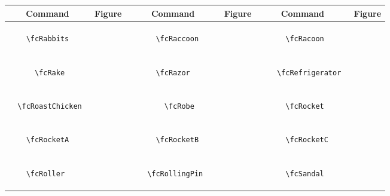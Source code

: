 \documentclass[x11names]{article}
\begin{document}
\begin{table}[H]\centering\begin{tabular}{|c|c|c|c|c|c|}\hline{\bf Command} & {\bf Figure} & {\bf Command} & {\bf Figure} & {\bf Command} & {\bf Figure}\\	\hline	&\multirow{5}{*}{	\fcRabbits	[scale=0.16]} & &\multirow{5}{*}{	\fcRaccoon	[scale=0.16]} & &\multirow{5}{*}{	\fcRacoon	[scale=0.16]}\\	& & & & & \\	& & & & & \\	\verb|	\fcRabbits	| & & \verb|	\fcRaccoon	| & & \verb|	\fcRacoon	| & \\	& & & & & \\	& & & & & \\	& & & & & \\	\hline									
		&\multirow{5}{*}{	\fcRake	[scale=0.16]} & &\multirow{5}{*}{	\fcRazor	[scale=0.16]} & &\multirow{5}{*}{	\fcRefrigerator	[scale=0.16]}\\	& & & & & \\	& & & & & \\	\verb|	\fcRake	| & & \verb|	\fcRazor	| & & \verb|	\fcRefrigerator	| & \\	& & & & & \\	& & & & & \\	& & & & & \\	\hline									
		&\multirow{5}{*}{	\fcRoastChicken	[scale=0.16]} & &\multirow{5}{*}{	\fcRobe	[scale=0.64]} & &\multirow{5}{*}{	\fcRocket	[scale=0.16]}\\	& & & & & \\	& & & & & \\	\verb|	\fcRoastChicken	| & & \verb|	\fcRobe	| & & \verb|	\fcRocket	| & \\	& & & & & \\	& & & & & \\	& & & & & \\	\hline									
		&\multirow{5}{*}{	\fcRocketA	[scale=0.16]} & &\multirow{5}{*}{	\fcRocketB	[scale=0.16]} & &\multirow{5}{*}{	\fcRocketC	[scale=0.16]}\\	& & & & & \\	& & & & & \\	\verb|	\fcRocketA	| & & \verb|	\fcRocketB	| & & \verb|	\fcRocketC	| & \\	& & & & & \\	& & & & & \\	& & & & & \\	\hline									
		&\multirow{5}{*}{	\fcRoller	[scale=0.16]} & &\multirow{5}{*}{	\fcRollingPin	[scale=0.16]} & &\multirow{5}{*}{	\fcSandal	[scale=0.64]}\\	& & & & & \\	& & & & & \\	\verb|	\fcRoller	| & & \verb|	\fcRollingPin	| & & \verb|	\fcSandal	| & \\	& & & & & \\	& & & & & \\	& & & & & \\	\hline									

\end{tabular}
\end{table}
\end{document}
